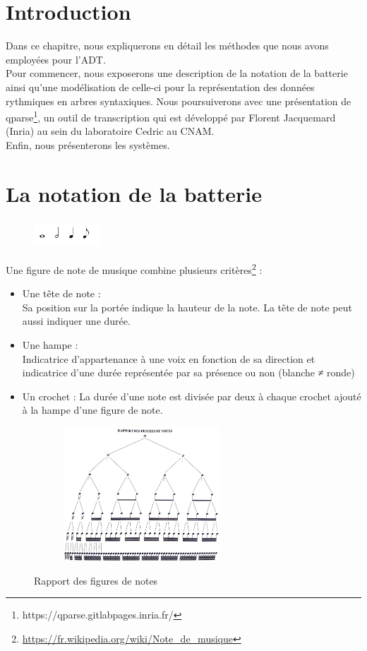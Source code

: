 \section*{Introduction}
Dans ce chapitre, nous expliquerons en détail les méthodes que nous avons employées pour l’ADT.\\
Pour commencer, nous exposerons une description de la notation de la batterie ainsi qu’une modélisation de celle-ci pour la représentation des données rythmiques en arbres syntaxiques. Nous poursuiverons avec une présentation de qparse\footnote{https://qparse.gitlabpages.inria.fr/}, un outil de transcription qui est développé par Florent Jacquemard (Inria) au sein du laboratoire Cedric au CNAM.\\
Enfin, nous présenterons les systèmes. 
\section{La notation de la batterie}
\label{notation_batterie}
\begin{figure}[h]
	\centering
	\includegraphics[height=10mm, width=25mm]{z_images/3_methodes/0_notation_de_la_batterie/0_figures_de_notes.png}
\end{figure}
Une figure de note \cite{danhauser} de musique combine plusieurs critères\footnote{\url{https://fr.wikipedia.org/wiki/Note_de_musique}} :
\begin{itemize}
	\item Une tête de note :\\
	Sa position sur la portée indique la hauteur de la note. La tête de note peut aussi indiquer une durée.
	\item Une hampe :\\
	Indicatrice d’appartenance à une voix en fonction de sa direction et indicatrice d’une durée représentée par sa présence ou non (blanche ≠ ronde)
	\item Un crochet : La durée d’une note est divisée par deux à chaque crochet ajouté à la hampe d’une figure de note.
\end{itemize}
\begin{figure}[h]
	\centering
	\includegraphics[height=50mm, width=80mm]{z_images/3_methodes/0_notation_de_la_batterie/1_rapport_figures_notes.png}
	\caption{Rapport des figures de notes}\cite{danhauser}
	\label{rapp_fig_notes}
\end{figure}
